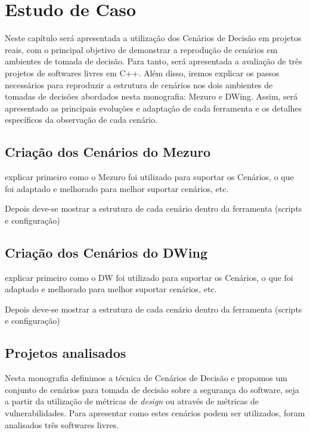 \chapter{Estudo de Caso}
\label{cap-case-study}

%

Neste capítulo será apresentada a utilização dos Cenários de Decisão em projetos reais, com o principal objetivo de demonstrar a reprodução de cenários em ambientes de tomada de decisão. Para tanto, será apresentada a avaliação de três projetos de softwares livres em C++. Além disso, iremos explicar os passos necessários para reproduzir a estrutura de cenários nos dois ambientes de tomadas de decisões abordados nesta monografia: Mezuro e DWing. Assim, será apresentado as principais evoluções e adaptação de cada ferramenta e os detalhes específicos da observação de cada cenário.

\section{Criação dos Cenários do Mezuro}
\label{mezuro-cenarios}

explicar primeiro como o Mezuro foi utilizado para suportar os Cenários, o que foi adaptado e melhorado para melhor suportar cenários, etc.

Depois deve-se mostrar a estrutura de cada cenário dentro da ferramenta (scripts e configuração)

\section{Criação dos Cenários do DWing}
\label{dw-cenarios}

explicar primeiro como o DW foi utilizado para suportar os Cenários, o que foi adaptado e melhorado para melhor suportar cenários, etc.

Depois deve-se mostrar a estrutura de cada cenário dentro da ferramenta (scripts e configuração)

\section{Projetos analisados}
\label{cap-projects}

Nesta monografia definimos a técnica de Cenários de Decisão e propomos um conjunto de cenários para tomada de decisão sobre a segurança do software, seja a partir da utilização de métricas de \emph{design} ou através de métricas de vulnerabilidades. Para apresentar como estes cenários podem ser utilizados, foram analisados três softwares livres. 

